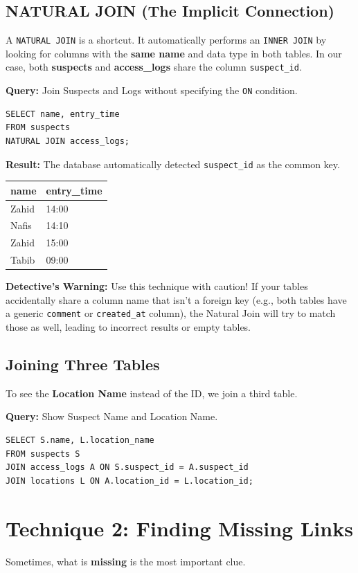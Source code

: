 \documentclass[12pt,a4paper]{article}
\begin{document}
\subsection{NATURAL JOIN (The Implicit Connection)}
A \texttt{NATURAL JOIN} is a shortcut. It automatically performs an \texttt{INNER JOIN} by looking for columns with the \textbf{same name} and data type in both tables. In our case, both \textbf{suspects} and \textbf{access\_logs} share the column \texttt{suspect\_id}.

\textbf{Query:} Join Suspects and Logs without specifying the \texttt{ON} condition.
\begin{lstlisting}
SELECT name, entry_time
FROM suspects
NATURAL JOIN access_logs;
\end{lstlisting}

\textbf{Result:}
The database automatically detected \texttt{suspect\_id} as the common key.
\begin{table}[H]
\centering
\begin{tabular}{@{}ll@{}}
\toprule
\textbf{name} & \textbf{entry\_time} \\ \midrule
Zahid & 14:00 \\
Nafis & 14:10 \\
Zahid & 15:00 \\
Tabib & 09:00 \\ \bottomrule
\end{tabular}
\end{table}

\textbf{Detective's Warning:} Use this technique with caution! If your tables accidentally share a column name that isn't a foreign key (e.g., both tables have a generic \texttt{comment} or \texttt{created\_at} column), the Natural Join will try to match those as well, leading to incorrect results or empty tables.

\subsection{Joining Three Tables}
To see the \textbf{Location Name} instead of the ID, we join a third table.

\textbf{Query:} Show Suspect Name and Location Name.
\begin{lstlisting}
SELECT S.name, L.location_name
FROM suspects S
JOIN access_logs A ON S.suspect_id = A.suspect_id
JOIN locations L ON A.location_id = L.location_id;
\end{lstlisting}

\newpage
\section{Technique 2: Finding Missing Links}
Sometimes, what is \textbf{missing} is the most important clue.
\end{document}
